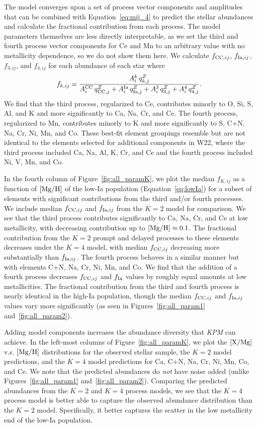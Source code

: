 \documentclass[modern]{aastex631}
\newcommand{\xmg}{[{\rm X}/{\rm Mg}]}
\newcommand{\mgh}{[{\rm Mg}/{\rm H}]}
\newcommand{\qcc}{q_{{\rm CC,}j}^{Z}}
\newcommand{\qIa}{q_{{\rm Ia,}j}^{Z}}
\newcommand{\Acc}{A^{\rm CC}_{i}}
\newcommand{\AIa}{A^{\rm Ia}_{i}}
\newcommand{\fcc}{f_{{\rm CC}, ij}}
\newcommand{\name}{\textsl{KPM}}
\begin{document}
The model converges upon a set of process vector components and amplitudes that can be combined with Equation~\ref{eq:mij_4} to predict the stellar abundances and calculate the fractional contribution from each process. The model parameters themselves are less directly interpretable, as we set the third and fourth process vector components for Ce and Mn to an arbitrary value with no metallicity dependence, so we do not show them here. We calculate $\fcc$, $f_{{\rm Ia}, ij}$, $f_{3, ij}$, and $f_{4, ij}$ for each abundance of each star where
\begin{equation}\label{eq:fX}
    f_{k, ij} = \frac{A_{i}^{k} \, q_{k,j}^Z}{\Acc\,\qcc + \AIa\,\qIa + A_{i}^{3}\,q_{3, j}^{Z} + A_{i}^{4}\,q_{4, j}^{Z}}.
\end{equation}
We find that the third process, regularized to Ce, contributes minorly to O, Si, S, Al, and K and more significantly to Ca, Na, Cr, and Ce. The fourth process, regularized to Mn, contributes minorly to K and more significantly to S, C+N, Na, Cr, Ni, Mn, and Co. These best-fit element groupings resemble but are not identical to the elements selected for additional components in W22, where the third process included Ca, Na, Al, K, Cr, and Ce and the fourth process included Ni, V, Mn, and Co. 

In the fourth column of Figure~\ref{fig:all_paramK}, we plot the median $f_{K, ij}$ as a function of $\mgh$ of the low-Ia population (Equation~\ref{eq:lowIa}) for a subset of elements with significant contributions from the third and/or fourth processes. We include median $\fcc$ and $f_{{\rm Ia},ij}$ from the $K=2$ model for comparison. We see that the third process contributes significantly to Ca, Na, Cr, and Ce at low metallicity, with decreasing contribution up to $\mgh\approx0.1$. The fractional contribution from the $K=2$ prompt and delayed processes to these elements decreases under the $K=4$ model, with median $\fcc$ decreasing more substantially than $f_{{\rm Ia}, ij}$. The fourth process behaves in a similar manner but with elements C+N, Na, Cr, Ni, Mn, and Co. We find that the addition of a fourth process decreases $\fcc$ and $f_{\rm Ia}$ values by roughly equal amounts at low metallicities. The fractional contribution from the third and fourth process is nearly identical in the high-Ia population, though the median $\fcc$ and $f_{{\rm Ia}, ij}$ values vary more significantly (as seen in Figures~\ref{fig:all_param1} and~\ref{fig:all_param2}).

Adding model components increases the abundance diversity that \name{} can achieve. In the left-most columns of Figure~\ref{fig:all_paramK}, we plot the $\xmg$ v.s. $\mgh$ distributions for the observed stellar sample, the $K=2$ model predictions, and the $K=4$ model predictions for Ca, C+N, Na, Cr, Ni, Mn, Co, and Ce. We note that the predicted abundances do \textit{not} have noise added (unlike Figures~\ref{fig:all_param1} and~\ref{fig:all_param2}). Comparing the predicted abundances from the $K=2$ and $K=4$ process models, we see that the $K=4$ process model is better able to capture the observed abundance distribution than the $K=2$ model. Specifically, it better captures the scatter in the low metallicity end of the low-Ia population. 
\end{document}
